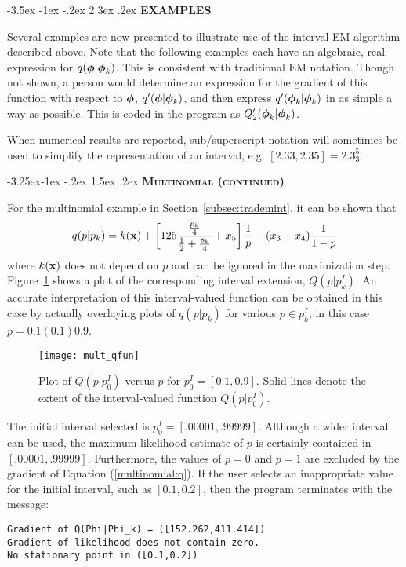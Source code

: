 \documentclass[10pt,twoside]{article}
\makeatletter
\renewcommand\section{\@startsection {section}{1}{\z@}%
                 {-3.5ex \@plus -1ex \@minus -.2ex}%
                 {2.3ex \@plus.2ex}%
                 {\normalfont\centering\bfseries }}
\renewcommand\subsection{\@startsection{subsection}{2}{\z@}%
                 {-3.25ex\@plus -1ex \@minus -.2ex}%
                 {1.5ex \@plus .2ex}%
                 {\scshape\centering\bfseries}} %
\makeatother
\begin{document}

\section{\bf EXAMPLES}\label{sec:examples}

Several examples are now presented to illustrate use of
the interval EM algorithm described above.
Note that the following examples each have an algebraic, real expression for
$q(\mbox{\boldmath $\phi$} | \mbox{\boldmath $\phi$}_k)$.  This is consistent with traditional EM notation. 
Though not shown, a person would determine an expression for the
gradient
of this function with respect to $\mbox{\boldmath $\phi$}$, $q'(\mbox{\boldmath $\phi$} | \mbox{\boldmath $\phi$}_k)$, and then
express $q'(\mbox{\boldmath $\phi$}_k | \mbox{\boldmath $\phi$}_k)$ in as simple a way as possible.  This is
coded in the program as $Q'_2(\mbox{\boldmath $\phi$}_k | \mbox{\boldmath $\phi$}_k)$.


When numerical results are reported, sub/superscript notation will sometimes
be used to simplify the representation of an interval, e.g. $[2.33,2.35] =
2.3_3^5$.

\subsection{\textsc \bf Multinomial (continued)}

For the multinomial example in Section~\ref{subsec:trademint}, 
it can be shown that
\begin{equation} \label{multinomial:q}
q(p | p_k) = k({\bf x}) +
\left[125\frac{\frac{p_k}{4}}{\frac{1}{2}+\frac{p_k}{4}}+x_5
\right]\frac{1}{p} - (x_3 + x_4) \frac{1}{1-p}
\end{equation}
where $k({\bf x})$ does not depend on $p$ and can be ignored in the maximization
step.  Figure~\ref{mult:qfuns} shows a plot of the corresponding interval
extension, $Q(p|p_k^I)$.  An accurate interpretation of this interval-valued
function can be obtained 
in this case by actually overlaying plots of $q(p|p_k)$
for various $p \in p_k^I$, in this case $p=0.1(0.1)0.9$.
\begin{figure}[ht]
\begin{center}
\resizebox{11 cm}{10 cm} {\texttt{[image: mult\_qfun]}}
\caption{Plot of $Q(p|p_0^I)$ versus $p$ for $p_0^I=[0.1,0.9]$.  Solid lines
denote the extent of the interval-valued function $Q(p|p_0^I)$.
\label{mult:qfuns}}
\end{center}
\end{figure}

The initial interval selected
is $p_0^I = [.00001,.99999]$.  Although a wider interval can
be used, the maximum
likelihood estimate of $p$ is certainly contained in $[.00001,.99999]$.
Furthermore, the values of $p=0$ and $p=1$ are excluded by the gradient of 
Equation
(\ref{multinomial:q}).  If the user selects an inappropriate value 
for the initial
interval, such as  
$[0.1,0.2]$, then the program terminates with the message:
\begin{verbatim}
Gradient of Q(Phi|Phi_k) = ([152.262,411.414])
Gradient of likelihood does not contain zero.
No stationary point in ([0.1,0.2])
\end{verbatim}
\end{document}
